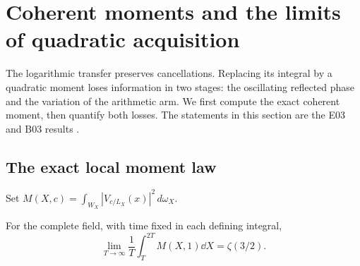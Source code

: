 \section{Coherent moments and the limits of quadratic acquisition}
\label{sec:coherent-moments}

The logarithmic transfer preserves cancellations. Replacing its
integral by a quadratic moment loses information in two stages: the
oscillating reflected phase and the variation of the arithmetic arm.
We first compute the exact coherent moment, then quantify both losses.
The statements in this section are the E03 and B03 results
\cite{GNPRSMoment,GNPRSPhaseObstruction}.

\subsection{The exact local moment law}
Set \(M(X,c)=\int_{W_X}|V_{c/L_X}(x)|^2\,d\omega_X\).
\begin{theorem}[Coherent moment at \(c=1\)]\label{thm:coherent-moment}
For the complete field, with time fixed in each defining integral,
\begin{equation}\label{eq:coherent-moment}
 \lim_{T\to\infty}\frac1T\int_T^{2T}M(X,1)\dd X=\zeta(3/2).
\end{equation}
\end{theorem}

